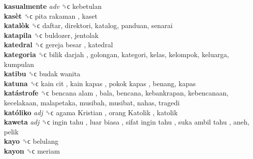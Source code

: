 \textbf{kasualmente} \emph{adv}  ␝ϲ  kebetulan  \\
\textbf{kasèt} ␝ϲ   pita rakaman , kaset  \\
\textbf{katalòk} ␝ϲ  daftar, direktori, katalog, panduan, senarai  \\
\textbf{katapila} ␝ϲ  buldozer, jentolak  \\
\textbf{katedral} ␝ϲ   gereja besar , katedral  \\
\textbf{kategoria} ␝ϲ   bilik darjah , golongan, kategori, kelas, kelompok, keluarga, kumpulan  \\
\textbf{katibu} ␝ϲ   budak wanita   \\
\textbf{katuna} ␝ϲ   kain cit ,  kain kapas ,  pokok kapas , benang, kapas  \\
\textbf{katástrofe} ␝ϲ   bencana alam , bala, bencana, kebankrapan, kebencanaan, kecelakaan, malapetaka, musibah, musibat, nahas, tragedi  \\
\textbf{katóliko} \emph{adj}  ␝ϲ   agama Kristian ,  orang Katolik , katolik  \\
\textbf{kaweta} \emph{adj}  ␝ϲ   ingin tahu ,  luar biasa ,  sifat ingin tahu ,  suka ambil tahu , aneh, pelik  \\
\textbf{kayo} ␝ϲ  belulang  \\
\textbf{kayon} ␝ϲ  meriam  \\

